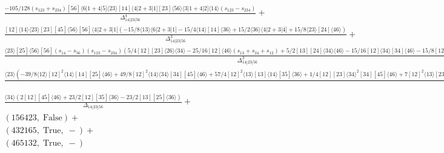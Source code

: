 \documentclass[varwidth, border=5pt]{standalone}
\begin{document}
\begin{my}
$\begin{gathered}
\scriptscriptstyle\frac{-105/128(s_{123}+s_{234})[56]⟨6|1+4|5]⟨23⟩[14]⟨4|2+3|1][23]⟨56⟩⟨3|1+4|2]⟨14⟩(s_{123}-s_{234})}{Δ_{14|23|56}^4}+\\
\scriptscriptstyle\frac{[12]⟨14⟩⟨23⟩[23][45]⟨56⟩[56]⟨4|2+3|1](-15/8⟨13⟩⟨6|2+3|1]-15/4⟨14⟩[14]⟨36⟩+15/2⟨36⟩⟨4|2+3|4]+15/8⟨23⟩[24]⟨46⟩)}{Δ_{14|23|56}^3}+\\
\scriptscriptstyle\frac{⟨23⟩[25]⟨56⟩[56](s_{14}-s_{56})(s_{123}-s_{234})(5/4[12][23]⟨26⟩⟨34⟩-25/16[12]⟨46⟩(s_{13}+s_{24}+s_{12})+5/2[13][24]⟨34⟩⟨46⟩-15/16[12]⟨34⟩[34]⟨46⟩-15/8[12]⟨14⟩⟨6|2+3|1])}{Δ_{14|23|56}^3}+\\
\scriptscriptstyle\frac{⟨23⟩(-39/8⟨12⟩[12]^2⟨14⟩[14][25]⟨46⟩+49/8[12]^2⟨14⟩⟨34⟩[34][45]⟨46⟩+57/4[12]^2⟨13⟩[13]⟨14⟩[35]⟨36⟩+1/4[12][23]⟨34⟩^2[34][45]⟨46⟩+7[12]^2⟨13⟩[23]⟨24⟩[45]⟨46⟩+3/8[12]^2⟨14⟩^2[14][45]⟨46⟩+53/4⟨12⟩[12]^3⟨14⟩[45]⟨46⟩+29/2[12]^2⟨13⟩[13]⟨14⟩[45]⟨46⟩-33/8[12]^3⟨14⟩^2⟨26⟩[45]-33/8[12]^2[13]⟨14⟩^2⟨36⟩[45]+3/2[12]^2⟨14⟩^2[14][35]⟨36⟩+5/4[12]^3⟨13⟩⟨14⟩⟨26⟩[35]-41/8[12]^2⟨13⟩⟨14⟩[14][35]⟨46⟩-47/4[12]^2⟨13⟩^2[13][35]⟨46⟩-7/8[12]^2⟨14⟩^2[14][15]⟨16⟩+57/8⟨12⟩[12]^3⟨14⟩[15]⟨16⟩+67/8[12]^2⟨13⟩[13]⟨14⟩[15]⟨16⟩+47/4[12]⟨13⟩^2[13]^2[25]⟨46⟩+1/4[12]⟨13⟩[13]⟨14⟩[14][25]⟨46⟩-9/2[12]⟨13⟩[13][23]⟨34⟩[45]⟨46⟩+11[13][23]^2⟨34⟩^2⟨36⟩[45]+11[12][23]^2⟨24⟩⟨34⟩⟨36⟩[45]-13[12]⟨13⟩[13]^2⟨14⟩[25]⟨36⟩-3/2[12][13]⟨14⟩^2[14][25]⟨36⟩+3/4[12]⟨23⟩[23]^2⟨34⟩[45]⟨46⟩-23/2[12][23]⟨34⟩^2[34][35]⟨36⟩+23/2⟨12⟩[12]^2[23]⟨34⟩[35]⟨36⟩+49/8[12]^2⟨14⟩⟨24⟩[24][45]⟨46⟩)}{Δ_{14|23|56}^2}+\\
\scriptscriptstyle\frac{⟨34⟩(2[12][45]⟨46⟩+23/2[12][35]⟨36⟩-23/2[13][25]⟨36⟩)}{Δ_{14|23|56}}+\\
\scriptscriptstyle(156423,\;\text{False})+\\
\scriptscriptstyle(432165,\;\text{True},\;-)+\\
\scriptscriptstyle(465132,\;\text{True},\;-)\phantom{+}
\end{gathered}$
\end{my}
\end{document}

